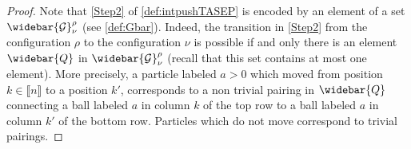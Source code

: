 \documentclass[12pt]{amsart}
\theoremstyle{definition}
\newcommand{\Gbar}{\widebar{\mathcal{G}}}
\newcommand{\Qbar}{\widebar{Q}}
\def\LW#1{(\textcolor{teal}{LW:#1})}
\begin{document}
\begin{proof}
 Note that \ref{Step2} of \cref{def:intpushTASEP} is encoded by 
an element of a set $\Gbar^{\rho}_{\nu}$ (see \cref{def:Gbar}).  
Indeed, the transition in \ref{Step2} from the configuration $\rho$ to the configuration $\nu$ is possible if and only there is an
element $\Qbar$ in $\Gbar^{\rho}_\nu$ (recall that this set contains at most one element).
More precisely,  a particle labeled $a>0$ which moved from position $k\in \llbracket n\rrbracket$ to a position $k'$, corresponds to a non trivial pairing in $\Qbar$ connecting a ball labeled $a$ in column $k$ of the top row to a ball labeled $a$ in column $k'$ of the bottom row. Particles which do not move correspond to trivial pairings. 


\end{proof}
\end{document}
